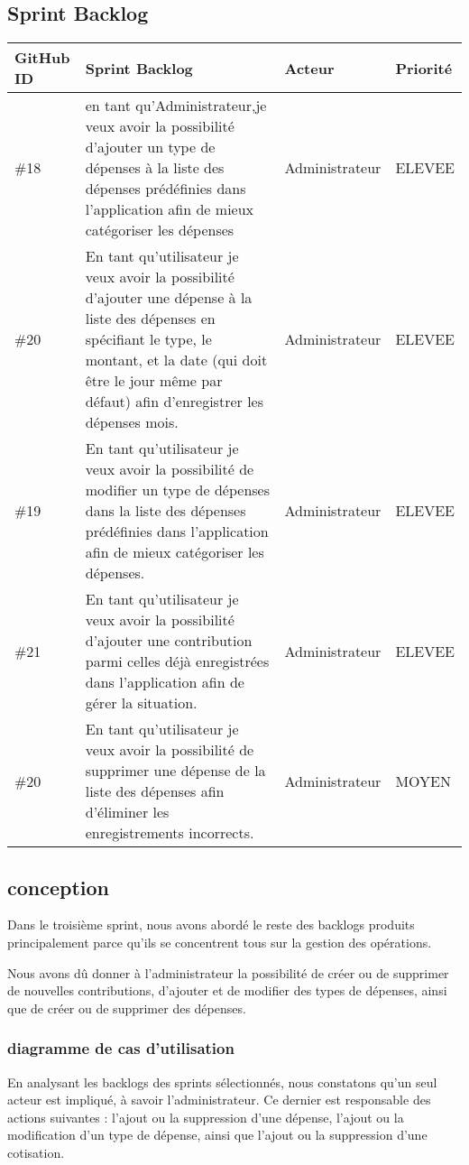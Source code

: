 \subsection{Sprint Backlog}
\begin{center}
  \begin{tabular}{ | m{1cm} | m{9cm}| m{2cm} | m{2cm} |} 
   \hline
   GitHub ID & Sprint Backlog & Acteur & Priorité \\ [0.5ex] 
   \hline\hline
   \#18 & en tant qu'Administrateur,je veux avoir la possibilité d'ajouter un type de dépenses à la liste des dépenses prédéfinies dans l'application afin de mieux catégoriser les dépenses& Administrateur & ELEVEE \\ 
   \hline
   \#20  & En tant qu'utilisateur je veux avoir la possibilité d'ajouter une dépense à la liste des dépenses en spécifiant le type, le montant, et la date (qui doit être le jour même par défaut) afin d'enregistrer les dépenses mois. & Administrateur & ELEVEE \\
   \hline
   \#19  & En tant qu'utilisateur je veux avoir la possibilité de modifier un type de dépenses dans la liste des dépenses prédéfinies dans l'application afin de mieux catégoriser les dépenses. & Administrateur & ELEVEE \\
   \hline
   \#21  & En tant qu'utilisateur je veux avoir la possibilité d'ajouter une contribution parmi celles déjà enregistrées dans l'application afin de gérer la situation. & Administrateur & ELEVEE \\
   \hline
   \#20  & En tant qu'utilisateur je veux avoir la possibilité de supprimer une dépense de la liste des dépenses afin d'éliminer les enregistrements incorrects. & Administrateur & MOYEN \\
   \hline
  \end{tabular}
\end{center}
\subsection{conception}
Dans le troisième sprint, nous avons abordé le reste des backlogs produits principalement parce qu'ils se concentrent tous sur la gestion des opérations. 

Nous avons dû donner à l'administrateur la possibilité de créer ou de supprimer de nouvelles contributions, d'ajouter et de modifier des types de dépenses, ainsi que de créer ou de supprimer des dépenses.

\subsubsection{diagramme de cas d'utilisation}
En analysant les backlogs des sprints sélectionnés, nous constatons qu'un seul acteur est impliqué, à savoir l'administrateur. Ce dernier est responsable des actions suivantes : l'ajout ou la suppression d'une dépense, l'ajout ou la modification d'un type de dépense, ainsi que l'ajout ou la suppression d'une cotisation.

$ $
